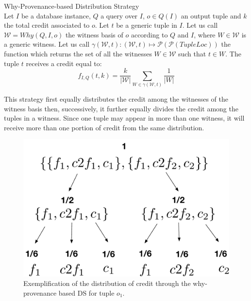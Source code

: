  \begin{definition}{Why-Provenance-based Distribution Strategy}\\
        \label{def:why_distribution}
    Let $I$ be a database instance, $Q$ a query over $I$, $o \in Q(I)$ an output tuple and $k$ the total credit associated to $o$. Let $t$ be a generic tuple in $I$.
    Let us call $\mathcal{W} = Why(Q, I, o)$ the witness basis of $o$ according to $Q$ and $I$, where $W \in \mathcal{W}$ is a generic witness. 
    Let us call $\gamma(\mathcal{W}, t): (\mathcal{W}, t) \mapsto \mathcal{P}(\mathcal{P}(TupleLoc))$ the function which returns the set of all the witnesses $W \in \mathcal{W}$ such that $t \in W$. The tuple $t$ receives a credit equal to:
    \begin{equation*}
        f_{I, Q}(t, k) =
            \frac{k}{|\mathcal{W}|}\sum_{W \in \gamma(\mathcal{W}, t)}\frac{1}{|W|}
    \end{equation*}
\end{definition}


This strategy first equally distributes the credit among the witnesses of the witness basis then, successively, it further equally divides the credit among the tuples in a witness. 
Since one tuple may appear in more than one witness, it will receive more than one portion of credit from the same distribution. 

\begin{figure}[]
\centering
  \includegraphics[width=.45\textwidth]{figures/why_distribution}
  \caption{Exemplification of the distribution of credit through the why-provenance based DS for tuple $o_1$.}
  \label{figure:why_prov_distribution}
\end{figure}


